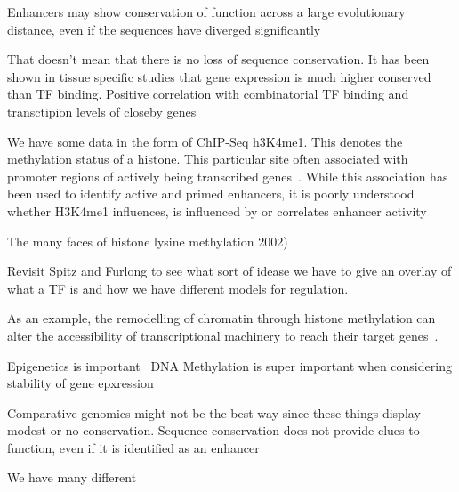         Enhancers may show conservation of function across a large evolutionary distance, even if the sequences have diverged significantly~\cite{tautz2000evolution}
        
        That doesn't mean that there is no loss of sequence conservation. It has been shown in tissue specific studies that gene expression is much higher conserved than TF binding. Positive correlation with combinatorial TF binding and transctipion levels of closeby genes~\cite{wong2014decoupling}
        
        We have some data in the form of ChIP-Seq h3K4me1. This denotes the methylation status of a histone. This particular site often associated with promoter regions of actively being transcribed genes~\cite{barski2007high}. 
        While this association has been used to identify active and primed enhancers, it is poorly understood whether H3K4me1 influences, is influenced by or correlates enhancer activity~\cite{rada2018h3k4me1}
        
        The many faces of histone lysine methylation 2002)
        
        Revisit Spitz and Furlong to see what sort of idease we have to give an overlay of what a TF is and how we have different models for regulation. 
        
       
        
        
        
        As an example, the remodelling of chromatin through histone methylation can alter the accessibility of transcriptional machinery to reach their target genes~\cite{gibney2010epigenetics, holoch2015rna }. 
        
        Epigenetics is important~\cite{holliday2006epigenetics}
        DNA Methylation is super important when considering stability of gene epxression~\cite{jaenisch2003epigenetic}
        
        Comparative genomics might not be the best way since these things display modest or no conservation. Sequence conservation does not provide clues to function, even if it is identified as an enhancer~\cite{pennacchio2013enhancers}
        
        
        We have many different 
